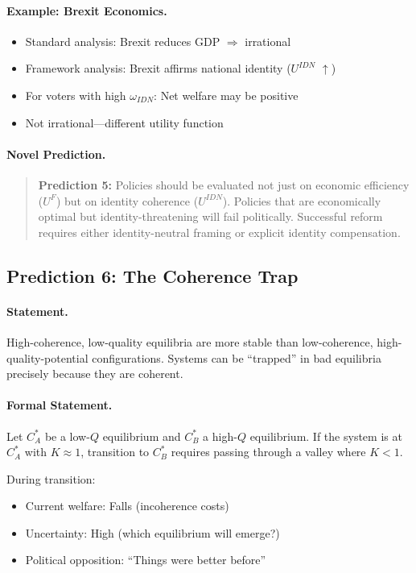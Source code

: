 \paragraph{Example: Brexit Economics.}
\begin{itemize}
  \item Standard analysis: Brexit reduces GDP $\Rightarrow$ irrational
  \item Framework analysis: Brexit affirms national identity ($U^{IDN}$ $\uparrow$)
  \item For voters with high $\omega_{IDN}$: Net welfare may be positive
  \item Not irrational---different utility function
\end{itemize}

\paragraph{Novel Prediction.}
\begin{quote}
\textbf{Prediction 5:} Policies should be evaluated not just on
economic efficiency ($U^F$) but on identity coherence ($U^{IDN}$).
Policies that are economically optimal but identity-threatening
will fail politically. Successful reform requires either
identity-neutral framing or explicit identity compensation.
\end{quote}

\subsection{Prediction 6: The Coherence Trap}

\paragraph{Statement.}
High-coherence, low-quality equilibria are more stable than
low-coherence, high-quality-potential configurations.
Systems can be ``trapped'' in bad equilibria precisely because
they are coherent.

\paragraph{Formal Statement.}
Let $C^*_A$ be a low-$Q$ equilibrium and $C^*_B$ a high-$Q$ equilibrium.
If the system is at $C^*_A$ with $K \approx 1$, transition to $C^*_B$
requires passing through a valley where $K < 1$.

During transition:
\begin{itemize}
  \item Current welfare: Falls (incoherence costs)
  \item Uncertainty: High (which equilibrium will emerge?)
  \item Political opposition: ``Things were better before''
\end{itemize}

